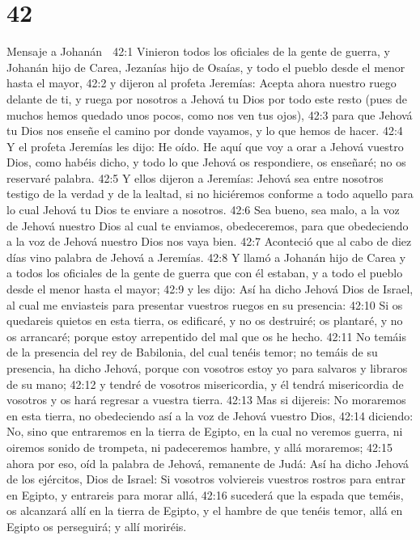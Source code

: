 \chapter{42}

Mensaje a Johanán  

42:1 Vinieron todos los oficiales de la gente de guerra, y Johanán hijo de Carea, Jezanías hijo de Osaías, y todo el pueblo desde el menor hasta el mayor,  
42:2 y dijeron al profeta Jeremías: Acepta ahora nuestro ruego delante de ti, y ruega por nosotros a Jehová tu Dios por todo este resto (pues de muchos hemos quedado unos pocos, como nos ven tus ojos),  
42:3 para que Jehová tu Dios nos enseñe el camino por donde vayamos, y lo que hemos de hacer.  
42:4 Y el profeta Jeremías les dijo: He oído. He aquí que voy a orar a Jehová vuestro Dios, como habéis dicho, y todo lo que Jehová os respondiere, os enseñaré; no os reservaré palabra.  
42:5 Y ellos dijeron a Jeremías: Jehová sea entre nosotros testigo de la verdad y de la lealtad, si no hiciéremos conforme a todo aquello para lo cual Jehová tu Dios te enviare a nosotros.  
42:6 Sea bueno, sea malo, a la voz de Jehová nuestro Dios al cual te enviamos, obedeceremos, para que obedeciendo a la voz de Jehová nuestro Dios nos vaya bien. 
42:7 Aconteció que al cabo de diez días vino palabra de Jehová a Jeremías.  
42:8 Y llamó a Johanán hijo de Carea y a todos los oficiales de la gente de guerra que con él estaban, y a todo el pueblo desde el menor hasta el mayor;  
42:9 y les dijo: Así ha dicho Jehová Dios de Israel, al cual me enviasteis para presentar vuestros ruegos en su presencia:  
42:10 Si os quedareis quietos en esta tierra, os edificaré, y no os destruiré; os plantaré, y no os arrancaré; porque estoy arrepentido del mal que os he hecho.  
42:11 No temáis de la presencia del rey de Babilonia, del cual tenéis temor; no temáis de su presencia, ha dicho Jehová, porque con vosotros estoy yo para salvaros y libraros de su mano;  
42:12 y tendré de vosotros misericordia, y él tendrá misericordia de vosotros y os hará regresar a vuestra tierra.  
42:13 Mas si dijereis: No moraremos en esta tierra, no obedeciendo así a la voz de Jehová vuestro Dios,  
42:14 diciendo: No, sino que entraremos en la tierra de Egipto, en la cual no veremos guerra, ni oiremos sonido de trompeta, ni padeceremos hambre, y allá moraremos;  
42:15 ahora por eso, oíd la palabra de Jehová, remanente de Judá: Así ha dicho Jehová de los ejércitos, Dios de Israel: Si vosotros volviereis vuestros rostros para entrar en Egipto, y entrareis para morar allá,  
42:16 sucederá que la espada que teméis, os alcanzará allí en la tierra de Egipto, y el hambre de que tenéis temor, allá en Egipto os perseguirá; y allí moriréis.  
